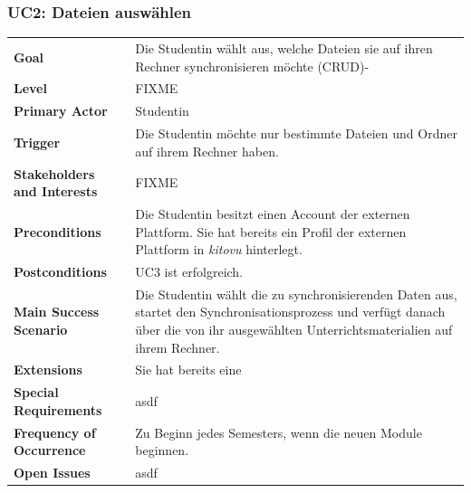 \documentclass[a4paper]{article}
\begin{document}
\subsubsection{UC2: Dateien auswählen}
\begin{tabulary}{\linewidth}{lp{30em}}
	\textbf{Goal} & Die Studentin wählt aus, welche Dateien sie auf ihren Rechner synchronisieren möchte (CRUD)-\\
	\textbf{Level} & FIXME \\
	\textbf{Primary Actor} & Studentin\\
	\textbf{Trigger} & Die Studentin möchte nur bestimmte Dateien und Ordner auf ihrem Rechner haben.\\
	\textbf{Stakeholders and Interests} & FIXME \\
	\textbf{Preconditions} & Die Studentin besitzt einen Account der externen Plattform. Sie hat bereits ein Profil der externen Plattform in \emph{kitovu} hinterlegt.\\
	\textbf{Postconditions} & UC3 ist erfolgreich.\\
	\textbf{Main Success Scenario} & Die Studentin wählt die zu synchronisierenden Daten aus, startet den Synchronisationsprozess und verfügt danach über die von ihr ausgewählten Unterrichtsmaterialien auf ihrem Rechner.\\
	\textbf{Extensions} & Sie hat bereits eine  \\
	\textbf{Special Requirements} & asdf \\
	\textbf{Frequency of Occurrence} & Zu Beginn jedes Semesters, wenn die neuen Module beginnen. \\
	\textbf{Open Issues} & asdf \\
\end{tabulary}
\end{document}
